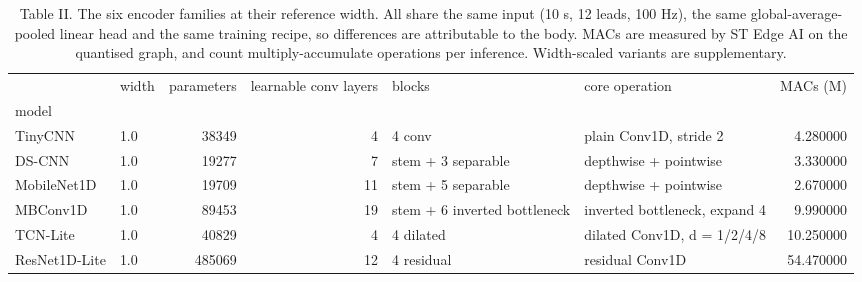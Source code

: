 \begin{table}
\caption{Table II. The six encoder families at their reference width. All share the same input (10 s, 12 leads, 100 Hz), the same global-average-pooled linear head and the same training recipe, so differences are attributable to the body. MACs are measured by ST Edge AI on the quantised graph, and count multiply-accumulate operations per inference. Width-scaled variants are supplementary.}
\begin{tabular}{llrrllr}
\toprule
 & width & parameters & learnable conv layers & blocks & core operation & MACs (M) \\
model &  &  &  &  &  &  \\
\midrule
TinyCNN & 1.0 & 38349 & 4 & 4 conv & plain Conv1D, stride 2 & 4.280000 \\
DS-CNN & 1.0 & 19277 & 7 & stem + 3 separable & depthwise + pointwise & 3.330000 \\
MobileNet1D & 1.0 & 19709 & 11 & stem + 5 separable & depthwise + pointwise & 2.670000 \\
MBConv1D & 1.0 & 89453 & 19 & stem + 6 inverted bottleneck & inverted bottleneck, expand 4 & 9.990000 \\
TCN-Lite & 1.0 & 40829 & 4 & 4 dilated & dilated Conv1D, d = 1/2/4/8 & 10.250000 \\
ResNet1D-Lite & 1.0 & 485069 & 12 & 4 residual & residual Conv1D & 54.470000 \\
\bottomrule
\end{tabular}
\end{table}
